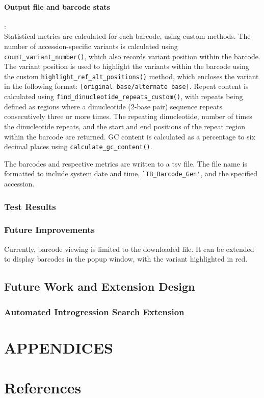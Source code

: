 \documentclass[12pt]{article}
\begin{document}
\paragraph{Output file and barcode stats}: \\
Statistical metrics are calculated for each barcode, using custom methods. The number of accession-specific variants is calculated using \verb+count_variant_number()+, which also records variant position within the barcode. The variant position is used to highlight the variants within the barcode using the custom \verb+highlight_ref_alt_positions()+ method, which encloses the variant in the following format: \verb+[original base/alternate base]+. Repeat content is calculated using \verb+find_dinucleotide_repeats_custom()+, with repeats being defined as regions where a dinucleotide (2-base pair) sequence repeats consecutively three or more times. The repeating dinucleotide, number of times the dinucleotide repeats, and the start and end positions of the repeat region within the barcode are returned. GC content is calculated as a percentage to six decimal places using \verb+calculate_gc_content()+. 

The barcodes and respective metrics are written to a tsv file. The file name is formatted to include system date and time, \verb+`TB_Barcode_Gen'+, and the specified accession. 

\subsubsection{Test Results}
\subsubsection{Future Improvements}
Currently, barcode viewing is limited to the downloaded file. It can be extended to display barcodes in the popup window, with the variant highlighted in red.

\subsection{Future Work and Extension Design}
\subsubsection{Automated Introgression Search Extension}

\section{APPENDICES}

\section {References}
\end{document}
